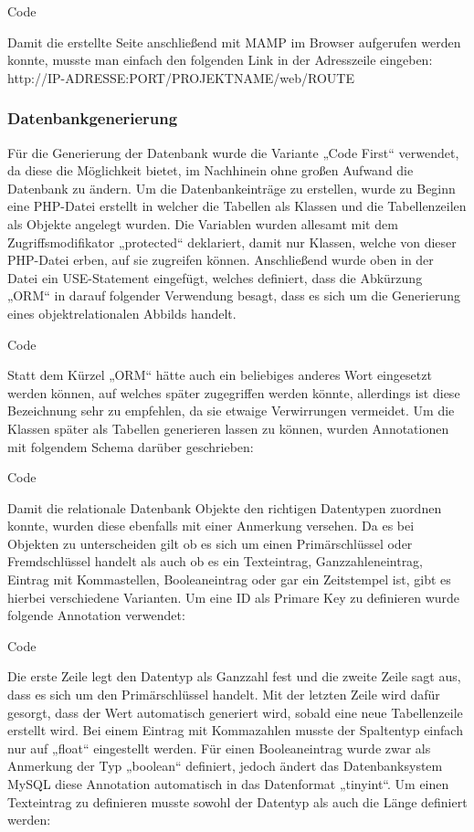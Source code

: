	Code
	
	Damit die erstellte Seite anschließend mit MAMP im Browser aufgerufen werden konnte, musste man einfach den folgenden Link in der Adresszeile eingeben:
	http://IP-ADRESSE:PORT/PROJEKTNAME/web/ROUTE

    \subsubsection{Datenbankgenerierung}

	Für die Generierung der Datenbank wurde die Variante „Code First“ verwendet, da diese die Möglichkeit bietet, im Nachhinein ohne großen Aufwand die Datenbank zu ändern.
	Um die Datenbankeinträge zu erstellen, wurde zu Beginn eine PHP-Datei erstellt in welcher die Tabellen als Klassen und die Tabellenzeilen als Objekte angelegt wurden. Die Variablen wurden allesamt mit dem Zugriffsmodifikator „protected“ deklariert, damit nur Klassen, welche von dieser PHP-Datei erben, auf sie zugreifen können. Anschließend wurde oben in der Datei ein USE-Statement eingefügt, welches definiert, dass die Abkürzung „ORM“ in darauf folgender Verwendung besagt, dass es sich um die Generierung eines objektrelationalen Abbilds handelt.
	
	Code
	
	Statt dem Kürzel „ORM“ hätte auch ein beliebiges anderes Wort eingesetzt werden können, auf welches später zugegriffen werden könnte, allerdings ist diese Bezeichnung sehr zu empfehlen, da sie etwaige Verwirrungen vermeidet.
	Um die Klassen später als Tabellen generieren lassen zu können, wurden Annotationen mit folgendem Schema darüber geschrieben:
	
	Code
	
	Damit die relationale Datenbank Objekte den richtigen Datentypen zuordnen konnte, wurden diese ebenfalls mit einer Anmerkung versehen. Da es bei Objekten zu unterscheiden gilt ob es sich um einen Primärschlüssel oder Fremdschlüssel handelt als auch ob es ein Texteintrag, Ganzzahleneintrag, Eintrag mit Kommastellen, Booleaneintrag oder gar ein Zeitstempel ist, gibt es hierbei verschiedene Varianten.
	Um eine ID als Primare Key zu definieren wurde folgende Annotation verwendet:
	
	Code
	
	Die erste Zeile legt den Datentyp als Ganzzahl fest und die zweite Zeile sagt aus, dass es sich um den Primärschlüssel handelt. Mit der letzten Zeile wird dafür gesorgt, dass der Wert automatisch generiert wird, sobald eine neue Tabellenzeile erstellt wird.
	Bei einem Eintrag mit Kommazahlen musste der Spaltentyp einfach nur auf „float“ eingestellt werden. Für einen Booleaneintrag wurde zwar als Anmerkung der Typ „boolean“ definiert, jedoch ändert das Datenbanksystem MySQL diese Annotation automatisch in das Datenformat „tinyint“.
	Um einen Texteintrag zu definieren musste sowohl der Datentyp als auch die Länge definiert werden:
	
